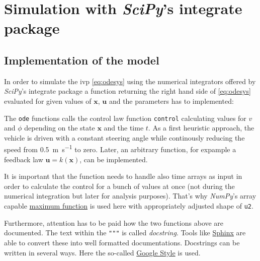 \documentclass[a4paper,11pt,headinclude=true,headsepline,parskip=half,DIV=13]{scrartcl}
\newcommand{\listcode}[3]{}
\newcommand{\listcodeplot}[2]{\listcode{#1}{#2}{../sim/01_car_example_plotting.py}}
\newcommand{\scipy}{\emph{SciPy}\xspace}
\newcommand{\numpy}{\emph{NumPy}\xspace}
\newcommand{\uu}{\mathbf{u}}
\newcommand{\x}{\mathbf{x}}
\begin{document}
\section{Simulation with \scipy's integrate package} \label{sec:simulation}

\subsection{Implementation of the model} \label{sec:implementation-model}
In order to simulate the \gls{ivp} \eqref{eq:odesys} using the numerical integrators offered by \scipy's integrate package a function returning the right hand side of \eqref{eq:odesys} evaluated for given values of $\x$, $\uu$ and the parameters has to implemented:
\listcodeplot{24}{44}
The \texttt{ode} functions calls the control law function \texttt{control} calculating values for $v$ and $\phi$ depending on the state $\x$ and the time $t$. As a first heuristic approach, the vehicle is driven with a constant steering angle while continously reducing the speed from \SI{0.5}{\meter\per\second} to zero. Later, an arbitrary function, for expample a feedback law $\uu=k(\x)$, can be implemented.
\listcodeplot{47}{60}
It is important that the function needs to handle also time arrays as input in order to calculate the control for a bunch of values at once (not during the numerical integration but later for analysis purposes). That's why \numpy's array capable \href{https://docs.scipy.org/doc/numpy/reference/generated/numpy.maximum.html}{maximum function} is used here with appropriately adjusted shape of \texttt{u2}.

Furthermore, attention has to be paid how the two functions above are documented. The text within the \texttt{"""} is called \emph{docstring}. Tools like \href{http://www.sphinx-doc.org/en/stable/}{Sphinx} are able to convert these into well formatted documentations. Docstrings can be written in several ways. Here the so-called \href{https://sphinxcontrib-napoleon.readthedocs.io/en/latest/example_google.html}{Google Style} is used.
\end{document}
